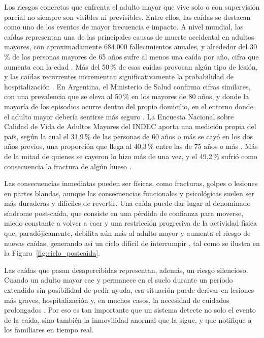 Los riesgos concretos que enfrenta el adulto mayor que vive solo o con supervisión parcial no siempre son visibles ni previsibles.
Entre ellos, las caídas se destacan como uno de los eventos de mayor frecuencia e impacto.
A nivel mundial, las caídas representan una de las principales causas de muerte accidental en adultos mayores, con aproximadamente 684.000 fallecimientos anuales, y alrededor del 30\,\% de las personas mayores de 65 años sufre al menos una caída por año, cifra que aumenta con la edad \parencite{YeohLui2025}.
Más del 50\,\% de esas caídas provocan algún tipo de lesión, y las caídas recurrentes incrementan significativamente la probabilidad de hospitalización \parencite{YeohLui2025}.
En Argentina, el Ministerio de Salud confirma cifras similares, con una prevalencia que se eleva al 50\,\% en los mayores de 80 años, y donde la mayoría de los episodios ocurre dentro del propio domicilio, en el entorno donde el adulto mayor debería sentirse más seguro \parencite{Spampinato}.
La Encuesta Nacional sobre Calidad de Vida de Adultos Mayores del INDEC aporta una medición propia del país, según la cual el 31,9\,\% de las personas de 60 años o más se cayó en los dos años previos, una proporción que llega al 40,3\,\% entre las de 75 años o más \parencite{INDEC2014}.
Más de la mitad de quienes se cayeron lo hizo más de una vez, y el 49,2\,\% sufrió como consecuencia la fractura de algún hueso \parencite{INDEC2014}.

Las consecuencias inmediatas pueden ser físicas, como fracturas, golpes o lesiones en partes blandas, aunque las consecuencias funcionales y psicológicas suelen ser más duraderas y difíciles de revertir.
Una caída puede dar lugar al denominado síndrome post-caída, que consiste en una pérdida de confianza para moverse, miedo constante a volver a caer y una restricción progresiva de la actividad física que, paradójicamente, debilita aún más al adulto mayor y aumenta el riesgo de nuevas caídas, generando así un ciclo difícil de interrumpir \parencite{Spampinato}, tal como se ilustra en la Figura~\ref{fig:ciclo_postcaida}.

Las caídas que pasan desapercibidas representan, además, un riesgo silencioso.
Cuando un adulto mayor cae y permanece en el suelo durante un período extendido sin posibilidad de pedir ayuda, esa situación puede derivar en lesiones más graves, hospitalización y, en muchos casos, la necesidad de cuidados prolongados \parencite{YeohLui2025}.
Por eso es tan importante que un sistema detecte no solo el evento de la caída, sino también la inmovilidad anormal que la sigue, y que notifique a los familiares en tiempo real.

